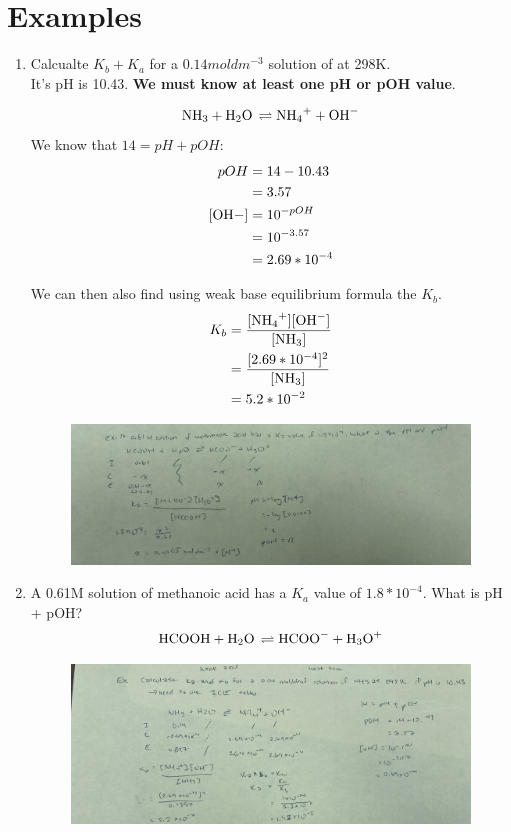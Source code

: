 \documentclass{article}
\begin{document}
\section{Examples}
\begin{enumerate}
\item Calcualte $K_{b} + K_{a}$ for a $0.14 mol dm^{-3}$ solution of  at 298K.\\It's pH is 10.43. \textbf{We must know at least one pH or pOH value}. 

$$\ce{NH3 + H2O \rightleftharpoons NH4+ + OH-}$$
We know that $14 = pH + pOH$:
\begin{align*}
pOH &= 14 - 10.43\\
&= 3.57\\
\ce{[OH-]} &= 10^{-pOH}\\
&= 10^{-3.57}\\
&= 2.69 * 10^{-4}
\end{align*}

We can then also find using weak base equilibrium formula the $K_{b}$.
\begin{align*}
K_{b} &= \frac{[\ce{NH4+}][\ce{OH-}]}{[\ce{NH3}]}\\
&= \frac{[2.69*10^{-4}]^{2}}{[\ce{NH3}]}\\
&= 5.2*10^{-2}\\
\end{align*}

\begin{figure}[H]
\includegraphics[width=\textwidth]{4.4fig3.jpg}
\end{figure}

\item A 0.61M solution of methanoic acid has a $K_{a}$ value of $1.8*10^{-4}$. What is pH + pOH?
$$\ce{HCOOH + H2O \rightleftharpoons HCOO- + H3O+}$$

\begin{figure}[H]
\includegraphics[width=\textwidth]{4.4fig4.jpg}
\end{figure}



\end{enumerate}
\end{document}
